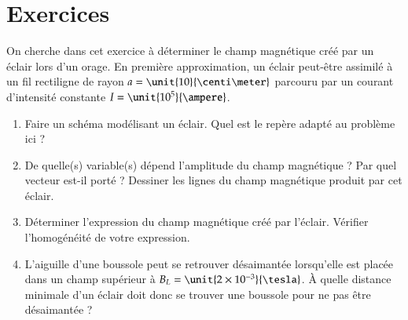 \section{Exercices}

\begin{exocor} 
On cherche dans cet exercice à déterminer le
champ magnétique créé par un éclair lors d'un orage.  En première
approximation, un éclair peut-être assimilé à un fil rectiligne de rayon
$a = \unit{10}{\centi \meter}$ parcouru par un courant d'intensité constante
$I = \unit{10^5}{\ampere}$.  
\begin{enumerate} 
	\item Faire un schéma modélisant un éclair. 
	Quel est le repère adapté au problème ici ?  
	\item  
	De quelle(s) variable(s) dépend l'amplitude du champ magnétique ? 
	Par quel vecteur est-il porté ?  
	Dessiner les lignes du champ magnétique produit par cet éclair.
	\item Déterminer l'expression du champ magnétique créé par l'éclair.
	      Vérifier l'homogénéité de votre expression.  
	\item L'aiguille d'une boussole peut se retrouver désaimantée 
	lorsqu'elle est placée dans un champ supérieur à 
	$B_L = \unit{2 \times 10^{-3}}{\tesla}$. À quelle distance minimale d'un
	éclair doit donc se trouver une boussole pour ne pas être désaimantée ?
\end{enumerate} 
\end{exocor}


